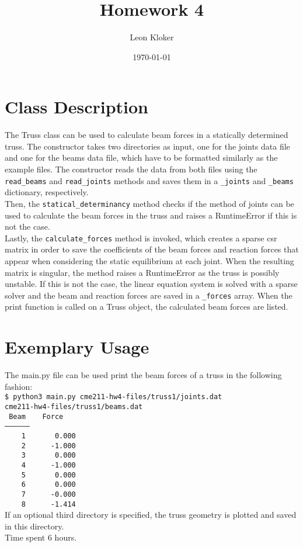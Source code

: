 \documentclass{article}
\title{Homework 4}
\author{Leon Kloker}
\date{\today}
\begin{document}
\section{Class Description}

The Truss class can be used to calculate beam forces in a statically
determined truss. The constructor takes two directories as input, one
for the joints data file and one for the beams data file, which have
to be formatted similarly as the example files. The constructor
reads the data from both files using the \texttt{read\_beams} and 
\texttt{read\_joints} methods and saves them in a \texttt{\_joints} 
and \texttt{\_beams} dictionary, respectively. \\
Then, the \texttt{statical\_determinancy} method checks if the method 
of joints can be used to calculate the beam forces in the truss and 
raises a RuntimeError if this is not the case.\\ 
Lastly, the \texttt{calculate\_forces} method is invoked,
which creates a sparse csr matrix in order to save the coefficients of
the beam forces and reaction forces that appear when considering the static
equilibrium at each joint. When the resulting matrix is singular, the method
raises a RuntimeError as the truss is possibly unstable. If this is not the 
case, the linear equation system is solved with a sparse solver and the 
beam and reaction forces are saved in a \texttt{\_forces} array. When the print
function is called on a Truss object, the calculated beam
forces are listed.

\section{Exemplary Usage}

The main.py file can be used print the beam forces of a truss in the 
following fashion:\\
\texttt{\$ python3 main.py cme211-hw4-files/truss1/joints.dat\\ 
cme211-hw4-files/truss1/beams.dat\\
~Beam~~~~Force\\
-----------------\\
~~~~1~~~~~~~0.000\\
~~~~2~~~~~~-1.000\\
~~~~3~~~~~~~0.000\\
~~~~4~~~~~~-1.000\\
~~~~5~~~~~~~0.000\\
~~~~6~~~~~~~0.000\\
~~~~7~~~~~~-0.000\\
~~~~8~~~~~~-1.414}
\vspace{0.5cm}\\
If an optional third directory is specified, the truss geometry 
is plotted and saved in this directory.\\
Time spent 6 hours.
\end{document}
